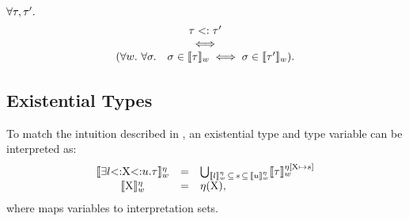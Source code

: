 \begin{theorem}{}
    $\forall \tau, \tau'.$
    \[
        \begin{array}{c}
            \tau <: \tau' \\
            \iff \\
            (\forall w.\ \forall \sigma.\quad \sigma \in \llbracket \tau \rrbracket_w \iff
                \sigma \in \llbracket \tau' \rrbracket_w).
        \end{array}
    \]
\end{theorem}

\subsection{Existential Types}

To match the intuition described in ,
an existential type and type variable can be interpreted as:
\[
\begin{array}{ccl}
    \llbracket \exists l{\operatorname{<:}}\mathrm{X}{\operatorname{<:}}u.\tau \rrbracket^{\eta}_w &=& 
        \bigcup_{\llbracket l \rrbracket^{\eta}_w\, \subseteq\, s\,
            \subseteq\, \llbracket u \rrbracket^{\eta}_w}
        \llbracket \tau \rrbracket^{\eta[\mathrm{X}\,\!\mapsto\!\,s]}_w \\
    \llbracket \mathrm{X} \rrbracket^{\eta}_w &=& \eta(\mathrm{X}), \\
\end{array}
\]
where %
\semsubstvars maps variables to interpretation sets.

